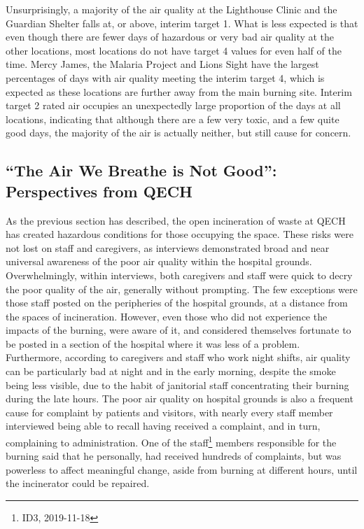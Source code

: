 \documentclass[
  authoryear,
  review,
  3p]{elsarticle}
\begin{document}
Unsurprisingly, a majority of the air quality at the Lighthouse Clinic
and the Guardian Shelter falls at, or above, interim target 1. What is
less expected is that even though there are fewer days of hazardous or
very bad air quality at the other locations, most locations do not have
target 4 values for even half of the time. Mercy James, the Malaria
Project and Lions Sight have the largest percentages of days with air
quality meeting the interim target 4, which is expected as these
locations are further away from the main burning site. Interim target 2
rated air occupies an unexpectedly large proportion of the days at all
locations, indicating that although there are a few very toxic, and a
few quite good days, the majority of the air is actually neither, but
still cause for concern.

\hypertarget{the-air-we-breathe-is-not-good-perspectives-from-qech}{%
\subsection{``The Air We Breathe is Not Good'': Perspectives from
QECH}\label{the-air-we-breathe-is-not-good-perspectives-from-qech}}

As the previous section has described, the open incineration of waste at
QECH has created hazardous conditions for those occupying the space.
These risks were not lost on staff and caregivers, as interviews
demonstrated broad and near universal awareness of the poor air quality
within the hospital grounds. Overwhelmingly, within interviews, both
caregivers and staff were quick to decry the poor quality of the air,
generally without prompting. The few exceptions were those staff posted
on the peripheries of the hospital grounds, at a distance from the
spaces of incineration. However, even those who did not experience the
impacts of the burning, were aware of it, and considered themselves
fortunate to be posted in a section of the hospital where it was less of
a problem. Furthermore, according to caregivers and staff who work night
shifts, air quality can be particularly bad at night and in the early
morning, despite the smoke being less visible, due to the habit of
janitorial staff concentrating their burning during the late hours. The
poor air quality on hospital grounds is also a frequent cause for
complaint by patients and visitors, with nearly every staff member
interviewed being able to recall having received a complaint, and in
turn, complaining to administration. One of the staff\footnote{ID3,
  2019-11-18} members responsible for the burning said that he
personally, had received hundreds of complaints, but was powerless to
affect meaningful change, aside from burning at different hours, until
the incinerator could be repaired.
\end{document}
